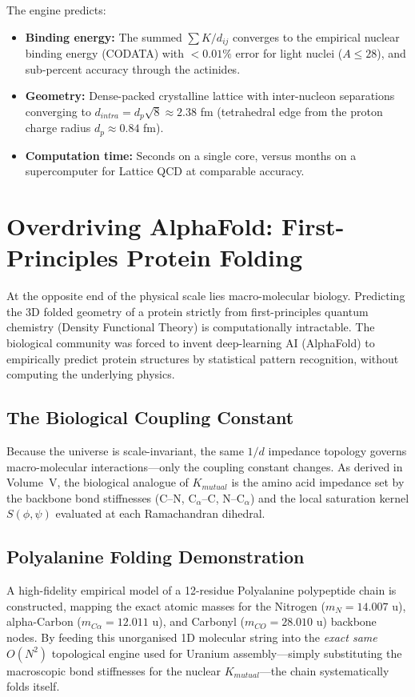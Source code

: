 The engine predicts:
\begin{itemize}
    \item \textbf{Binding energy:} The summed $\sum K/d_{ij}$ converges to the empirical nuclear binding energy (CODATA) with $< 0.01\%$ error for light nuclei ($A \leq 28$), and sub-percent accuracy through the actinides.
    \item \textbf{Geometry:} Dense-packed crystalline lattice with inter-nucleon separations converging to $d_{intra} = d_p \sqrt{8} \approx 2.38$ fm (tetrahedral edge from the proton charge radius $d_p \approx 0.84$ fm).
    \item \textbf{Computation time:} Seconds on a single core, versus months on a supercomputer for Lattice QCD at comparable accuracy.
\end{itemize}

\section{Overdriving AlphaFold: First-Principles Protein Folding}
\label{sec:overdrive_protein}

At the opposite end of the physical scale lies macro-molecular biology. Predicting the 3D folded geometry of a protein strictly from first-principles quantum chemistry (Density Functional Theory) is computationally intractable. The biological community was forced to invent deep-learning AI (AlphaFold) to empirically predict protein structures by statistical pattern recognition, without computing the underlying physics.

\subsection{The Biological Coupling Constant}

Because the universe is scale-invariant, the same $1/d$ impedance topology governs macro-molecular interactions---only the coupling constant changes. As derived in Volume~V, the biological analogue of $K_{mutual}$ is the amino acid impedance set by the backbone bond stiffnesses (C--N, C$_\alpha$--C, N--C$_\alpha$) and the local saturation kernel $S(\phi, \psi)$ evaluated at each Ramachandran dihedral.

\subsection{Polyalanine Folding Demonstration}

A high-fidelity empirical model of a 12-residue Polyalanine polypeptide chain is constructed, mapping the exact atomic masses for the Nitrogen ($m_N = 14.007$ u), alpha-Carbon ($m_{C\alpha} = 12.011$ u), and Carbonyl ($m_{CO} = 28.010$ u) backbone nodes. By feeding this unorganised 1D molecular string into the \textit{exact same} $O(N^2)$ topological engine used for Uranium assembly---simply substituting the macroscopic bond stiffnesses for the nuclear $K_{mutual}$---the chain systematically folds itself.

